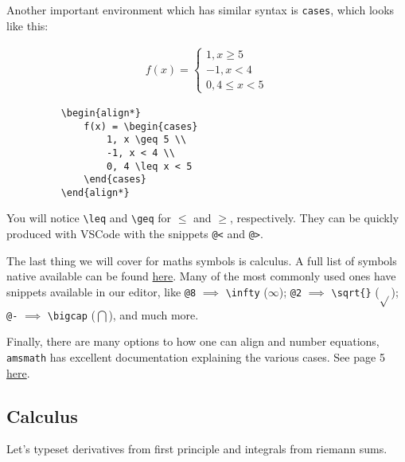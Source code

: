 Another important environment which has similar syntax is \verb|cases|, which looks like this:

\begin{figure}[h]
	\begin{minipage}{0.45\textwidth}
    \begin{align*}
        f(x) = \begin{cases}
            1, x \geq 5 \\
            -1, x < 4 \\
            0, 4 \leq x < 5  
        \end{cases}
    \end{align*}
\end{minipage}
\begin{minipage}{0.45\textwidth}
    \begin{lstlisting}
    \begin{align*}
        f(x) = \begin{cases}
            1, x \geq 5 \\
            -1, x < 4 \\
            0, 4 \leq x < 5  
        \end{cases}
    \end{align*}
    \end{lstlisting}
\end{minipage}
\end{figure}

You will notice \verb|\leq| and \verb|\geq| for \( \leq \) and \( \geq \), respectively.
They can be quickly produced with VSCode with the snippets \verb|@<| and \verb|@>|.

The last thing we will cover for maths symbols is calculus.
A full list of symbols native available can be found \href{https://oeis.org/wiki/List_of_LaTeX_mathematical_symbols}{here}.
Many of the most commonly used ones have snippets available in our editor, like \verb|@8| \( \implies \) \verb|\infty| (\( \infty\)); \verb|@2| \( \implies \) \verb|\sqrt{}| (\(\sqrt{} \)); \verb|@-| \( \implies \) \verb|\bigcap| (\( \bigcap \)), and much more.

Finally, there are many options to how one can align and number equations, \texttt{amsmath} has excellent documentation explaining the various cases.
See page 5 \href{https://anorien.csc.warwick.ac.uk/mirrors/CTAN/macros/latex/required/amsmath/amsldoc.pdf}{here}.

\subsection{Calculus}
Let's typeset derivatives from first principle and integrals from riemann sums.

